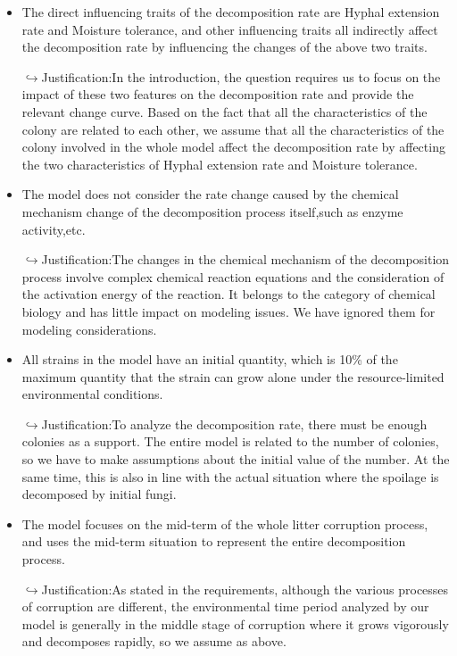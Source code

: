 \documentclass{mcmthesis}
\begin{document}
\begin{itemize}
\item 
The direct influencing traits of the decomposition rate are Hyphal extension rate and Moisture tolerance, and other influencing traits all indirectly affect the decomposition rate by influencing the changes of the above two traits.

$\hookrightarrow$Justification:In the introduction, the question requires us to focus on the impact of these two features on the decomposition rate and provide the relevant change curve. Based on the fact that all the characteristics of the colony are related to each other, we assume that all the characteristics of the colony involved in the whole model affect the decomposition rate by affecting the two characteristics of Hyphal extension rate and Moisture tolerance.

\item 
The model does not consider the rate change caused by the chemical mechanism change of the decomposition process itself,such as enzyme activity,etc.

$\hookrightarrow$Justification:The changes in the chemical mechanism of the decomposition process involve complex chemical reaction equations and the consideration of the activation energy of the reaction. It belongs to the category of chemical biology and has little impact on modeling issues. We have ignored them for modeling considerations.

\item 
All strains in the model have an initial quantity, which is 10\% of the maximum quantity that the strain can grow alone under the resource-limited environmental conditions.

$\hookrightarrow$Justification:To analyze the decomposition rate, there must be enough colonies as a support. The entire model is related to the number of colonies, so we have to make assumptions about the initial value of the number. At the same time, this is also in line with the actual situation where the spoilage is decomposed by initial fungi.

\item 
The model focuses on the mid-term of the whole litter corruption process, and uses the mid-term situation to represent the entire decomposition process.

$\hookrightarrow$Justification:As stated in the requirements, although the various processes of corruption are different, the environmental time period analyzed by our model is generally in the middle stage of corruption where it grows vigorously and decomposes rapidly, so we assume as above.


\end{itemize}
\end{document}
